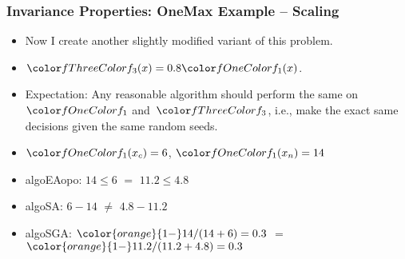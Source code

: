 \documentclass[aspectratio=169,mathserif,notheorems]{beamer}%
\begin{document}
%
%
\begin{frame}%
\frametitle{Invariance Properties: OneMax Example -- Scaling}%
\parbox{0.415\paperwidth}{%
\begin{itemize}%
\item Now I create another slightly modified variant of this problem.%
\item<2-> $\fn{3}(x)=0.8\fn{1}(x)$.%
\item<3-> Expectation: Any reasonable algorithm should perform the same on~$\fn{1}$ and~$\fn{3}$, i.e., make the exact same decisions given the same random seeds.%
%
\item<5-> $\fn{1}(x_c)=6$, $\fn{1}(x_n)=14$%
%
\item<7-> \gls{algoEAopo}: $14\leq6$ \textcolor{greenYesColor}{$\mathbf{=}$} $11.2\leq4.8$ \greenYes%
%
\item<8-> \gls{algoSA}: $6-14$ \textcolor{redNoColor}{$\mathbf{\neq}$} $4.8-11.2$ \redNo%
%
\item<9-> \gls{algoSGA}: ${\color{orange}{1-}}14/(14+6)=0.3$ \textcolor{greenYesColor}{$\mathbf{=}$} ${\color{orange}{1-}}11.2/(11.2+4.8)=0.3$ \greenYes%
\end{itemize}%
}%
%
%
%
%
%
%
%
%
%
\end{frame}%
%
\end{document}
